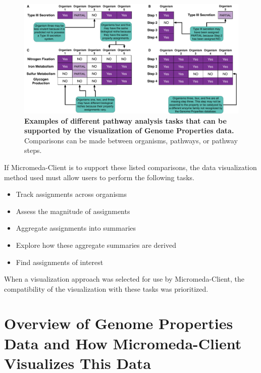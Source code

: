 \begin{figure}[!ht]
  \centering
	\includegraphics[width=\textwidth]{media/analysis_types.pdf}
	 \caption[Examples of different pathway analysis tasks that can be supported by 
the visualization of Genome Properties data.]{\textbf{Examples of different 
pathway analysis tasks that can be supported by the visualization of Genome 
Properties data.} Comparisons can be made between 
organisms, pathways, or pathway steps.}
	 \label{fig:client-analysis-types}
\end{figure}

\FloatBarrier
If Micromeda-Client is to support these listed comparisons, the data visualization 
method used must allow users to perform the following tasks.

\FloatBarrier
\begin{itemize}
\item Track assignments across organisms
\item Assess the magnitude of assignments
\item Aggregate assignments into summaries
\item Explore how these aggregate summaries are derived
\item Find assignments of interest
\end{itemize}

When a visualization approach was selected for use by Micromeda-Client, the 
compatibility of the visualization with these tasks was prioritized.

\section{Overview of Genome Properties Data and How Micromeda-Client Visualizes This Data} \label{client-visualization}

